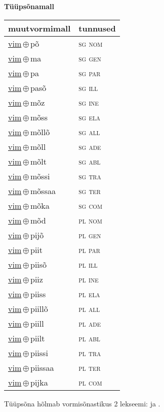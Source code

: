 

\vspace{3.5em}
\noindent \begin{minipage}{\textwidth}
\noindent \textbf{Tüüpsõnamall \,}\\

\begin{sideways}
\begin{tabular}{l l}
muutvormimall & tunnused \\
\hline
\underline{vim}\,$\oplus$\,põ & \textsc{ sg nom } \\
\underline{vim}\,$\oplus$\,ma & \textsc{ sg gen } \\
\underline{vim}\,$\oplus$\,pa & \textsc{ sg par } \\
\underline{vim}\,$\oplus$\,pasõ & \textsc{ sg ill } \\
\underline{vim}\,$\oplus$\,mõz & \textsc{ sg ine } \\
\underline{vim}\,$\oplus$\,mõss & \textsc{ sg ela } \\
\underline{vim}\,$\oplus$\,mõllõ & \textsc{ sg all } \\
\underline{vim}\,$\oplus$\,mõll & \textsc{ sg ade } \\
\underline{vim}\,$\oplus$\,mõlt & \textsc{ sg abl } \\
\underline{vim}\,$\oplus$\,mõssi & \textsc{ sg tra } \\
\underline{vim}\,$\oplus$\,mõssaa & \textsc{ sg ter } \\
\underline{vim}\,$\oplus$\,mõka & \textsc{ sg com } \\
\underline{vim}\,$\oplus$\,mõd & \textsc{ pl nom } \\
\underline{vim}\,$\oplus$\,pijõ & \textsc{ pl gen } \\
\underline{vim}\,$\oplus$\,piit & \textsc{ pl par } \\
\underline{vim}\,$\oplus$\,piisõ & \textsc{ pl ill } \\
\underline{vim}\,$\oplus$\,piiz & \textsc{ pl ine } \\
\underline{vim}\,$\oplus$\,piiss & \textsc{ pl ela } \\
\underline{vim}\,$\oplus$\,piillõ & \textsc{ pl all } \\
\underline{vim}\,$\oplus$\,piill & \textsc{ pl ade } \\
\underline{vim}\,$\oplus$\,piilt & \textsc{ pl abl } \\
\underline{vim}\,$\oplus$\,piissi & \textsc{ pl tra } \\
\underline{vim}\,$\oplus$\,piissaa & \textsc{ pl ter } \\
\underline{vim}\,$\oplus$\,pijka & \textsc{ pl com } \\
\end{tabular}
\end{sideways}
\label{tab:tüüpsõnamall-vimpõ}

\end{minipage}

 
\vspace{1em}
\noindent Tüüpsõna hõlmab vormisõnastikus 2 lekseemi:  ja .
